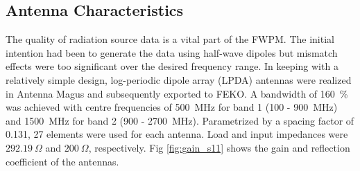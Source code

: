 \documentclass[10pt,journal,twoside]{IEEEtran}
\begin{document}
\subsection{Antenna Characteristics}
The quality of radiation source data is a vital part of the FWPM. The initial intention had been to generate the data using half-wave dipoles but mismatch effects were too significant over the desired frequency range. In keeping with a relatively simple design, log-periodic dipole array (LPDA) antennas were realized in Antenna Magus and subsequently exported to FEKO. A bandwidth of \SI{160}{\%} was achieved with centre frequencies of \SI{500}{MHz} for band 1 (\SI{100}{} - \SI{900}{MHz}) and \SI{1500}{MHz} for band 2 (\SI{900}{} - \SI{2700}{MHz}). Parametrized by a spacing factor of \num{0.131}, \num{27} elements were used for each antenna. Load and input impedances were $\SI{292.19}{\Omega}$ and $\SI{200}{\Omega}$, respectively. %
Fig \ref{fig:gain_s11} shows the gain and reflection coefficient of the antennas.
\end{document}
